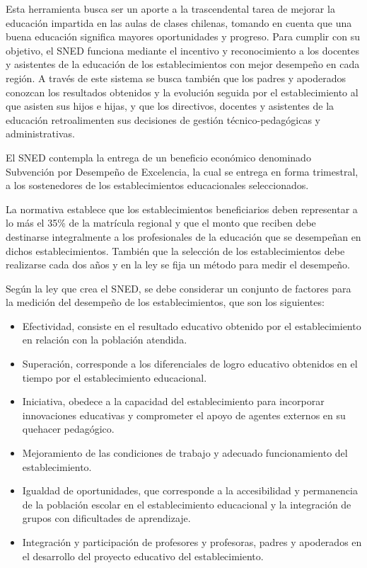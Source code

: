 \begin{description}
Esta herramienta busca ser un aporte a la trascendental tarea de mejorar la educación impartida en las aulas de clases chilenas, tomando en cuenta que una buena educación significa mayores oportunidades y progreso. Para cumplir con su objetivo, el SNED funciona mediante el incentivo y reconocimiento a los docentes y asistentes de la educación de los establecimientos con mejor desempeño en cada región. A través de este sistema se busca también que los padres y apoderados conozcan los resultados obtenidos y la evolución seguida por el establecimiento al que asisten sus hijos e hijas, y que los directivos, docentes y asistentes de la educación retroalimenten sus decisiones de gestión técnico-pedagógicas y administrativas.

El SNED contempla la entrega de un beneficio económico denominado Subvención por Desempeño de Excelencia, la cual se entrega en forma trimestral, a los sostenedores de los establecimientos educacionales seleccionados.

La normativa establece que los establecimientos beneficiarios deben representar a lo más el 35\% de la matrícula regional y que el monto que reciben debe destinarse integralmente a los profesionales de la educación que se desempeñan en dichos establecimientos. También que la selección de los establecimientos debe realizarse cada dos años y en la ley se fija un método para medir el desempeño.

Según la ley que crea el SNED, se debe considerar un conjunto de factores para la medición del desempeño de los establecimientos, que son los siguientes:

\begin{itemize}
    \item Efectividad, consiste en el resultado educativo obtenido por el establecimiento en relación con la población atendida.
    \item Superación, corresponde a los diferenciales de logro educativo obtenidos en el tiempo por el establecimiento educacional.
    \item Iniciativa, obedece a la capacidad del establecimiento para incorporar innovaciones educativas y comprometer el apoyo de agentes externos en su quehacer pedagógico.
    \item Mejoramiento de las condiciones de trabajo y adecuado funcionamiento del establecimiento.
    \item Igualdad de oportunidades, que corresponde a la accesibilidad y permanencia de la población escolar en el establecimiento educacional y la integración de grupos con dificultades de aprendizaje.
    \item Integración y participación de profesores y profesoras, padres y apoderados en el desarrollo del proyecto educativo del establecimiento.
\end{itemize}


\end{description}
